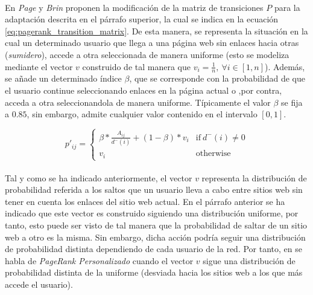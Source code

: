 \documentclass{subfiles}
\begin{document}
      \paragraph{}
      En \cite{page1999pagerank} \emph{Page} y \emph{Brin} proponen la modificación de la matriz de transiciones $P$ para la adaptación descrita en el párrafo superior, la cual se indica en la ecuación \eqref{eq:pagerank_transition_matrix}. De esta manera, se representa la situación en la cual un determinado usuario que llega a una página web sin enlaces hacia otras (\emph{sumidero}), accede a otra seleccionada de manera uniforme (esto se modeliza mediante el vector $v$ construido de tal manera que  $v_{i} = \frac{1}{n}, \ \forall i \in [1,n]$). Además, se añade un determinado índice $\beta$, que se corresponde con la probabilidad de que el usuario continue seleccionando enlaces en la página actual o ,por contra, acceda a otra seleccionandola de manera uniforme. Típicamente el valor $\beta$ se fija a $0.85$, sin embargo, admite cualquier valor contenido en el intervalo $[0,1]$.

      \begin{equation}
      \label{eq:pagerank_transition_matrix}
        p'_{ij} =
        \begin{cases}
          \beta * \frac{A_{ij}}{d^-(i)} + (1- \beta) * v_{i} & \mbox{if} \ d^-(i) \neq 0 \\
          v_{i}&\mbox{otherwise}
        \end{cases}
      \end{equation}

      \paragraph{}
      Tal y como se ha indicado anteriormente, el vector $v$ representa la distribución de probabilidad referida a los saltos que un usuario lleva a cabo entre sitios web sin tener en cuenta los enlaces del sitio web actual. En el párrafo anterior se ha indicado que este vector es construido siguiendo una distribución uniforme, por tanto, esto puede ser visto de tal manera que la probabilidad de saltar de un sitio web a otro es la misma. Sin embargo, dicha acción podría seguir una distribución de probabilidad distinta dependiendo de cada usuario de la red. Por tanto, en \cite{page1999pagerank} se habla de \emph{PageRank Personalizado} cuando el vector $v$ sigue una distribución de probabilidad distinta de la uniforme (desviada hacia los sitios web a los que más accede el usuario).
\end{document}
